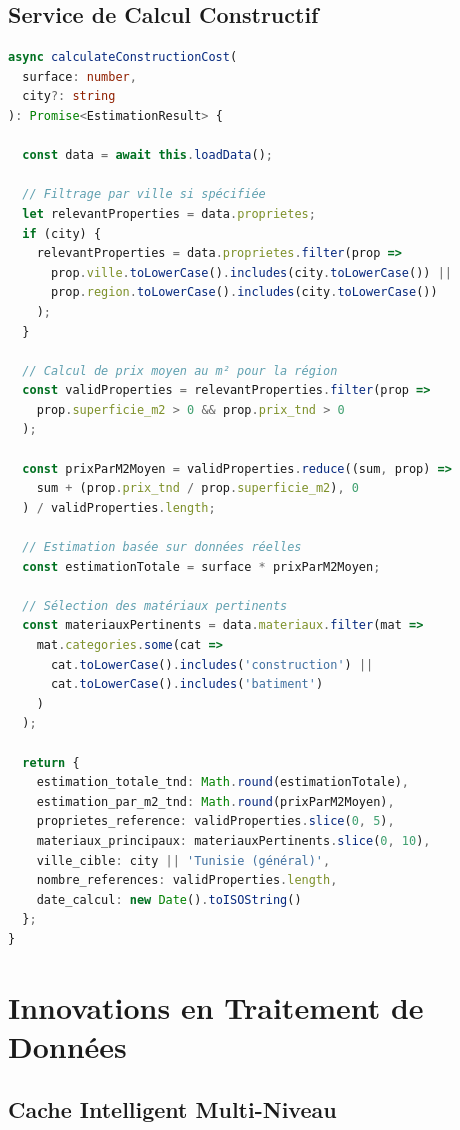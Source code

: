 \subsection{Service de Calcul Constructif}

\begin{lstlisting}[language=TypeScript, caption=Calcul d'estimation avec données certifiées]
async calculateConstructionCost(
  surface: number, 
  city?: string
): Promise<EstimationResult> {
  
  const data = await this.loadData();
  
  // Filtrage par ville si spécifiée
  let relevantProperties = data.proprietes;
  if (city) {
    relevantProperties = data.proprietes.filter(prop => 
      prop.ville.toLowerCase().includes(city.toLowerCase()) ||
      prop.region.toLowerCase().includes(city.toLowerCase())
    );
  }
  
  // Calcul de prix moyen au m² pour la région
  const validProperties = relevantProperties.filter(prop => 
    prop.superficie_m2 > 0 && prop.prix_tnd > 0
  );
  
  const prixParM2Moyen = validProperties.reduce((sum, prop) => 
    sum + (prop.prix_tnd / prop.superficie_m2), 0
  ) / validProperties.length;
  
  // Estimation basée sur données réelles
  const estimationTotale = surface * prixParM2Moyen;
  
  // Sélection des matériaux pertinents
  const materiauxPertinents = data.materiaux.filter(mat => 
    mat.categories.some(cat => 
      cat.toLowerCase().includes('construction') ||
      cat.toLowerCase().includes('batiment')
    )
  );
  
  return {
    estimation_totale_tnd: Math.round(estimationTotale),
    estimation_par_m2_tnd: Math.round(prixParM2Moyen),
    proprietes_reference: validProperties.slice(0, 5),
    materiaux_principaux: materiauxPertinents.slice(0, 10),
    ville_cible: city || 'Tunisie (général)',
    nombre_references: validProperties.length,
    date_calcul: new Date().toISOString()
  };
}
\end{lstlisting}

\section{Innovations en Traitement de Données}

\subsection{Cache Intelligent Multi-Niveau}

